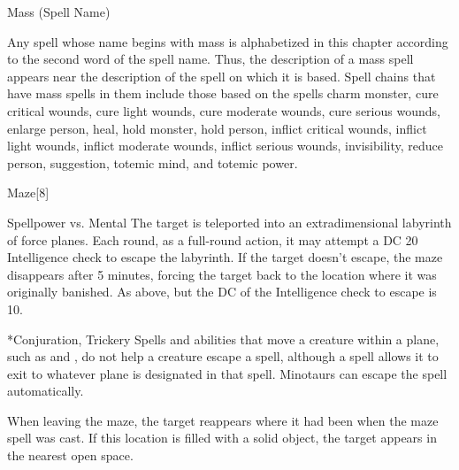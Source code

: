 \begin{spellsection}{Mass (Spell Name)}
    \par Any spell whose name begins with mass is alphabetized in this chapter according to the second word of the spell name. Thus, the description of a mass spell appears near the description of the spell on which it is based. Spell chains that have mass spells in them include those based on the spells charm monster, cure critical wounds, cure light wounds, cure moderate wounds, cure serious wounds, enlarge person, heal, hold monster, hold person, inflict critical wounds, inflict light wounds, inflict moderate wounds, inflict serious wounds, invisibility, reduce person, suggestion, totemic mind, and totemic power.
\end{spellsection}

\begin{spellsection}{Maze}[8]
    \begin{spellheader}
    \end{spellheader}
    \begin{spellcontent}
        \begin{spelltargetinginfo}
        \end{spelltargetinginfo}
        \begin{spelleffects}
            \begin{spellattack}{Spellpower vs. Mental}
                \spellsuccess The target is teleported into an extradimensional labyrinth of force planes. Each round, as a full-round action, it may attempt a DC 20 Intelligence check to escape the labyrinth. If the target doesn't escape, the maze disappears after 5 minutes, forcing the target back to the location where it was originally banished.
                \spellfailure As above, but the DC of the Intelligence check to escape is 10.
            \end{spellattack}
        \end{spelleffects}
    \end{spellcontent}
    \begin{spellfooter}
        *{Conjuration, Trickery}
        \spellnotes Spells and abilities that move a creature within a plane, such as  and , do not help a creature escape a  spell, although a  spell allows it to exit to whatever plane is designated in that spell. Minotaurs can escape the spell automatically.

        When leaving the maze, the target reappears where it had been when the maze spell was cast. If this location is filled with a solid object, the target appears in the nearest open space.

        \norepeatspellnotes
        \miscastrandom
    \end{spellfooter}
\end{spellsection}

